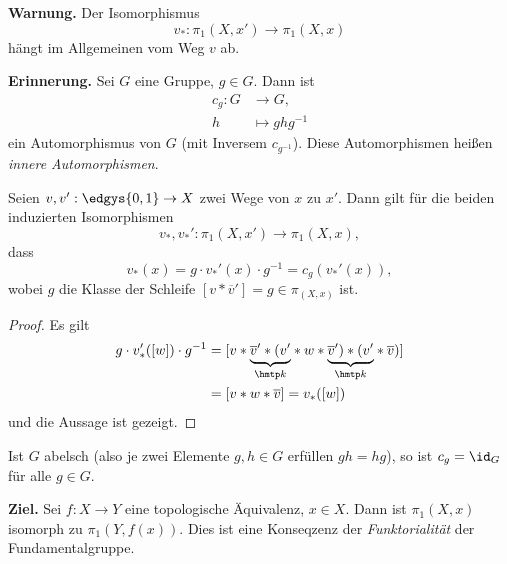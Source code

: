 \documentclass[language=ngerman]{TemplateLecture} %
\begin{document}
\textbf{Warnung.} Der Isomorphismus 
\begin{equation*}
    v_* : \pi_1(X,x') \to \pi_1(X,x)
\end{equation*}
hängt im Allgemeinen vom Weg $v$ ab.



\textbf{Erinnerung.} Sei $G$ eine Gruppe, $g \in G$. Dann ist 
\begin{align*}
    c_g : G &\to G, \\
        h &\mapsto ghg^{-1}
\end{align*}
ein Automorphismus von $G$ (mit Inversem $c_{g^{-1}}$). Diese Automorphismen heißen \emph{innere Automorphismen}.

Seien $v, v': \edgys{0,1} \to X$ zwei Wege von $x$ zu $x'$. Dann gilt für die beiden induzierten Isomorphismen
\begin{equation*}
    v_*, v_*': \pi_1(X, x') \to \pi_1(X, x),
\end{equation*}
dass
\begin{equation*}
    v_*(x) = g \cdot v_*'(x) \cdot g^{-1} = c_g(v_*'(x)),
\end{equation*}
wobei $g$ die Klasse der Schleife $[v * \overline{v}'] = g \in \pi_(X,x)$ ist.

\begin{proof}
    Es gilt 
    \begin{align*}
        g \cdot v_*'([w]) \cdot g^{-1} &= [v * \underset{\hmtp k}{\underbrace{\overline{v}' * (v'}} * w * \underset{\hmtp k}{\underbrace{\overline{v}') * (v'}} * \overline{v})] \\
        &= [v * w * \overline{v}] = v_*([w])
    \end{align*}
    und die Aussage ist gezeigt.
\end{proof}

\begin{remark}
    Ist $G$ abelsch (also je zwei Elemente $g, h \in G$ erfüllen $gh = hg$), so ist $c_g = \id_G$ für alle $g \in G$.
\end{remark}

\textbf{Ziel.} Sei $f: X \to Y$ eine topologische Äquivalenz, $x \in X$. Dann ist $\pi_1(X,x)$ isomorph zu $\pi_1(Y, f(x))$. Dies ist eine Konseqzenz der \emph{Funktorialität} der Fundamentalgruppe.
\end{document}

